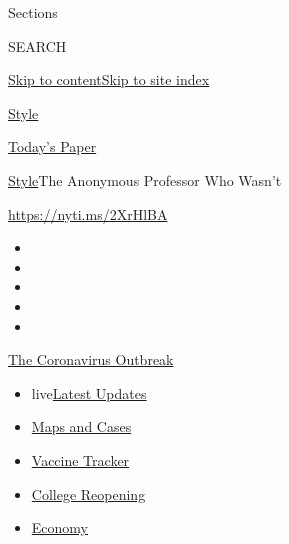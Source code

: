 Sections

SEARCH

\protect\hyperlink{site-content}{Skip to
content}\protect\hyperlink{site-index}{Skip to site index}

\href{https://www.nytimes.com/section/style}{Style}

\href{https://myaccount.nytimes.com/auth/login?response_type=cookie\&client_id=vi}{}

\href{https://www.nytimes.com/section/todayspaper}{Today's Paper}

\href{/section/style}{Style}\textbar{}The Anonymous Professor Who Wasn't

\url{https://nyti.ms/2XrHlBA}

\begin{itemize}
\item
\item
\item
\item
\item
\end{itemize}

\href{https://www.nytimes.com/news-event/coronavirus?action=click\&pgtype=Article\&state=default\&region=TOP_BANNER\&context=storylines_menu}{The
Coronavirus Outbreak}

\begin{itemize}
\tightlist
\item
  live\href{https://www.nytimes.com/2020/08/04/world/coronavirus-cases.html?action=click\&pgtype=Article\&state=default\&region=TOP_BANNER\&context=storylines_menu}{Latest
  Updates}
\item
  \href{https://www.nytimes.com/interactive/2020/us/coronavirus-us-cases.html?action=click\&pgtype=Article\&state=default\&region=TOP_BANNER\&context=storylines_menu}{Maps
  and Cases}
\item
  \href{https://www.nytimes.com/interactive/2020/science/coronavirus-vaccine-tracker.html?action=click\&pgtype=Article\&state=default\&region=TOP_BANNER\&context=storylines_menu}{Vaccine
  Tracker}
\item
  \href{https://www.nytimes.com/2020/08/02/us/covid-college-reopening.html?action=click\&pgtype=Article\&state=default\&region=TOP_BANNER\&context=storylines_menu}{College
  Reopening}
\item
  \href{https://www.nytimes.com/live/2020/08/04/business/stock-market-today-coronavirus?action=click\&pgtype=Article\&state=default\&region=TOP_BANNER\&context=storylines_menu}{Economy}
\end{itemize}

